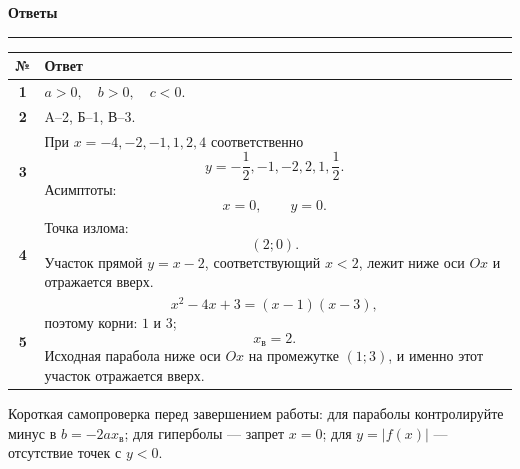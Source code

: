 \documentclass[a4paper,12pt]{article}
\newcommand{\topic}[1]{%
  \vspace{0.25em}
  {\Large\bfseries\color{darkaccent}#1}\par
  \vspace{0.1em}
  {\color{accent}\rule{\linewidth}{0.7pt}}\par
  \vspace{0.35em}
}
\begin{document}
\topic{Ответы}

\begin{table}[ht]
\centering
\begin{tabularx}{\linewidth}{@{}>{\bfseries}c X@{}}
\toprule
№ & Ответ \\
\midrule
1 &
$\displaystyle a>0,\quad b>0,\quad c<0.$
\\[2mm]

2 &
A--2, Б--1, В--3.
\\[2mm]

3 &
При $x=-4,-2,-1,1,2,4$ соответственно
\[
  y=-\frac12,-1,-2,2,1,\frac12.
\]
Асимптоты:
\[
  x=0,\qquad y=0.
\]
\\[2mm]

4 &
Точка излома:
\[
  (2;0).
\]
Участок прямой $y=x-2$, соответствующий $x<2$, лежит ниже оси $Ox$
и отражается вверх.
\\[2mm]

5 &
\[
  x^2-4x+3=(x-1)(x-3),
\]
поэтому корни: $1$ и $3$;
\[
  x_{\text{в}}=2.
\]
Исходная парабола ниже оси $Ox$ на промежутке $(1;3)$,
и именно этот участок отражается вверх.
\\
\bottomrule
\end{tabularx}
\end{table}

\vfill

{\small\color{textgray}
Короткая самопроверка перед завершением работы:
для параболы контролируйте минус в $b=-2ax_{\text{в}}$;
для гиперболы --- запрет $x=0$;
для $y=|f(x)|$ --- отсутствие точек с $y<0$.
}
\end{document}
